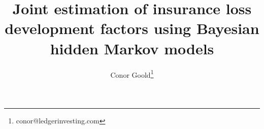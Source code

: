 \title{Joint estimation of insurance loss development factors using Bayesian hidden Markov models}
\author[]{Conor Goold\thanks{conor@ledgerinvesting.com}}
